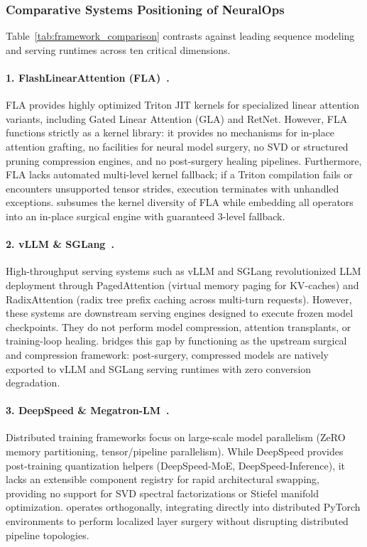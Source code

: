 \subsubsection{Comparative Systems Positioning of NeuralOps}
Table~\ref{tab:framework_comparison} contrasts \neuralops{} against leading sequence modeling and serving runtimes across ten critical dimensions.

\paragraph{1. FlashLinearAttention (FLA)~\cite{yang2024fla}.}
FLA provides highly optimized Triton JIT kernels for specialized linear attention variants, including Gated Linear Attention (GLA) and RetNet. However, FLA functions strictly as a kernel library: it provides no mechanisms for in-place attention grafting, no facilities for neural model surgery, no SVD or structured pruning compression engines, and no post-surgery healing pipelines. Furthermore, FLA lacks automated multi-level kernel fallback; if a Triton compilation fails or encounters unsupported tensor strides, execution terminates with unhandled exceptions. \neuralops{} subsumes the kernel diversity of FLA while embedding all operators into an in-place surgical engine with guaranteed 3-level fallback.

\paragraph{2. vLLM \& SGLang~\cite{kwon2023vllm,zheng2024sglang}.}
High-throughput serving systems such as vLLM and SGLang revolutionized LLM deployment through PagedAttention (virtual memory paging for KV-caches) and RadixAttention (radix tree prefix caching across multi-turn requests). However, these systems are downstream serving engines designed to execute frozen model checkpoints. They do not perform model compression, attention transplants, or training-loop healing. \neuralops{} bridges this gap by functioning as the upstream surgical and compression framework: post-surgery, compressed models are natively exported to vLLM and SGLang serving runtimes with zero conversion degradation.

\paragraph{3. DeepSpeed \& Megatron-LM~\cite{rasley2020deepspeed}.}
Distributed training frameworks focus on large-scale model parallelism (ZeRO memory partitioning, tensor/pipeline parallelism). While DeepSpeed provides post-training quantization helpers (DeepSpeed-MoE, DeepSpeed-Inference), it lacks an extensible component registry for rapid architectural swapping, providing no support for SVD spectral factorizations or Stiefel manifold optimization. \neuralops{} operates orthogonally, integrating directly into distributed PyTorch environments to perform localized layer surgery without disrupting distributed pipeline topologies.

